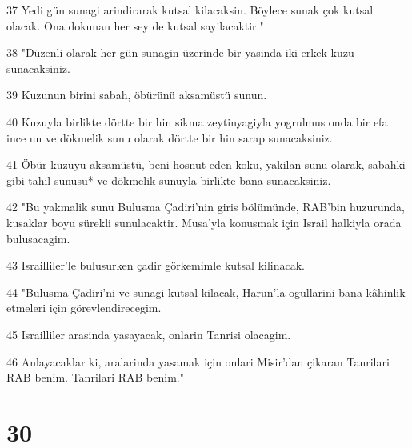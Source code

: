 \par 37 Yedi gün sunagi arindirarak kutsal kilacaksin. Böylece sunak çok kutsal olacak. Ona dokunan her sey de kutsal sayilacaktir."
\par 38 "Düzenli olarak her gün sunagin üzerinde bir yasinda iki erkek kuzu sunacaksiniz.
\par 39 Kuzunun birini sabah, öbürünü aksamüstü sunun.
\par 40 Kuzuyla birlikte dörtte bir hin sikma zeytinyagiyla yogrulmus onda bir efa ince un ve dökmelik sunu olarak dörtte bir hin sarap sunacaksiniz.
\par 41 Öbür kuzuyu aksamüstü, beni hosnut eden koku, yakilan sunu olarak, sabahki gibi tahil sunusu* ve dökmelik sunuyla birlikte bana sunacaksiniz.
\par 42 "Bu yakmalik sunu Bulusma Çadiri'nin giris bölümünde, RAB'bin huzurunda, kusaklar boyu sürekli sunulacaktir. Musa'yla konusmak için Israil halkiyla orada bulusacagim.
\par 43 Israilliler'le bulusurken çadir görkemimle kutsal kilinacak.
\par 44 "Bulusma Çadiri'ni ve sunagi kutsal kilacak, Harun'la ogullarini bana kâhinlik etmeleri için görevlendirecegim.
\par 45 Israilliler arasinda yasayacak, onlarin Tanrisi olacagim.
\par 46 Anlayacaklar ki, aralarinda yasamak için onlari Misir'dan çikaran Tanrilari RAB benim. Tanrilari RAB benim."

\chapter{30}

